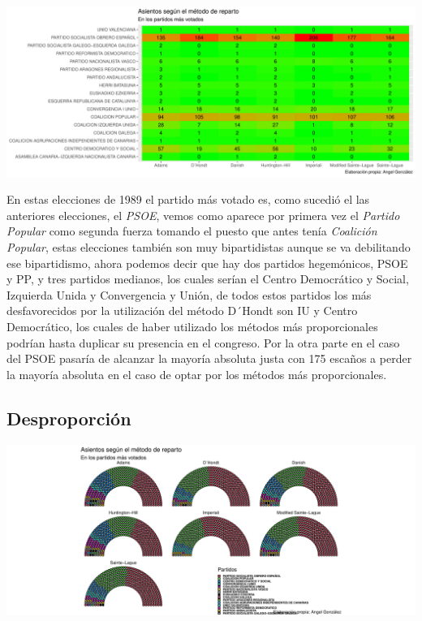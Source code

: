 \documentclass[12pt,a4paper,]{book}
\numberwithin{dummy}{section}
\theoremstyle{ocrenumbox}
\theoremstyle{blacknumex}
\theoremstyle{blacknumbox}
\theoremstyle{ocrenum}
\theoremstyle{ocrenum}
\begin{document}
\begin{center}\includegraphics[width=1\linewidth]{figurasR/unnamed-chunk-88-2} \end{center}

En estas elecciones de 1989 el partido más votado es, como sucedió el
las anteriores elecciones, el \emph{PSOE}, vemos como aparece por
primera vez el \emph{Partido Popular} como segunda fuerza tomando el
puesto que antes tenía \emph{Coalición Popular}, estas elecciones
también son muy bipartidistas aunque se va debilitando ese bipartidismo,
ahora podemos decir que hay dos partidos hegemónicos, PSOE y PP, y tres
partidos medianos, los cuales serían el Centro Democrático y Social,
Izquierda Unida y Convergencia y Unión, de todos estos partidos los más
desfavorecidos por la utilización del método D´Hondt son IU y Centro
Democrático, los cuales de haber utilizado los métodos más
proporcionales podrían hasta duplicar su presencia en el congreso. Por
la otra parte en el caso del PSOE pasaría de alcanzar la mayoría
absoluta justa con 175 escaños a perder la mayoría absoluta en el caso
de optar por los métodos más proporcionales.

\hypertarget{desproporciuxf3n-4}{%
\subsection{Desproporción}\label{desproporciuxf3n-4}}

\begin{center}\includegraphics[width=1\linewidth]{figurasR/unnamed-chunk-89-1} \end{center}
\end{document}
